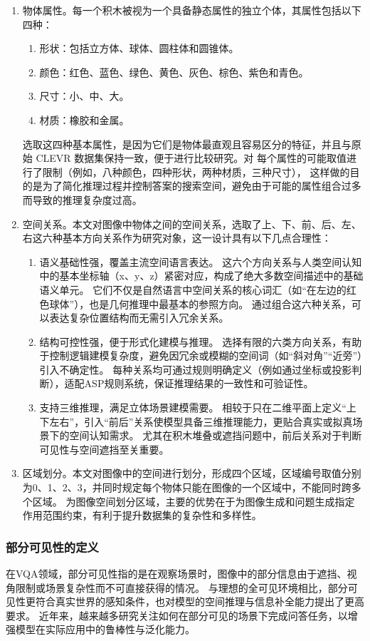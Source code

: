\begin{enumerate}[nosep]
\item 物体属性。每一个积木被视为一个具备静态属性的独立个体，其属性包括以下四种：
\begin{enumerate}[nosep]
\item 形状：包括立方体、球体、圆柱体和圆锥体。
\item 颜色：红色、蓝色、绿色、黄色、灰色、棕色、紫色和青色。
\item 尺寸：小、中、大。
\item 材质：橡胶和金属。
\end{enumerate}
选取这四种基本属性，是因为它们是物体最直观且容易区分的特征，并且与原始 CLEVR 数据集保持一致，便于进行比较研究。对
每个属性的可能取值进行了限制（例如，八种颜色，四种形状，两种材质，三种尺寸），
这样做的目的是为了简化推理过程并控制答案的搜索空间，避免由于可能的属性组合过多而导致的推理复杂度过高。
\item 空间关系。本文对图像中物体之间的空间关系，选取了上、下、前、后、左、右这六种基本方向关系作为研究对象，这一设计具有以下几点合理性：
\begin{enumerate}[nosep]
\item 语义基础性强，覆盖主流空间语言表达。
这六个方向关系与人类空间认知中的基本坐标轴（x、y、z）紧密对应，构成了绝大多数空间描述中的基础语义单元。
它们不仅是自然语言中空间关系的核心词汇（如“在左边的红色球体”），也是几何推理中最基本的参照方向。
通过组合这六种关系，可以表达复杂位置结构而无需引入冗余关系。
\item 结构可控性强，便于形式化建模与推理。
选择有限的六类方向关系，有助于控制逻辑建模复杂度，避免因冗余或模糊的空间词（如“斜对角”“近旁”）引入不确定性。
每种关系均可通过规则明确定义（例如通过坐标或投影判断），适配ASP规则系统，保证推理结果的一致性和可验证性。
\item 支持三维推理，满足立体场景建模需要。
相较于只在二维平面上定义“上下左右”，引入“前后”关系使模型具备三维推理能力，更贴合真实或拟真场景下的空间认知需求。
尤其在积木堆叠或遮挡问题中，前后关系对于判断可见性与空间遮挡至关重要。
\end{enumerate}
\item 区域划分。本文对图像中的空间进行划分，形成四个区域，区域编号取值分别为0、1、2、3，并同时规定每个物体只能在图像的一个区域中，不能同时跨多个区域。
为图像空间划分区域，主要的优势在于为图像生成和问题生成指定作用范围约束，有利于提升数据集的复杂性和多样性。
\end{enumerate}
\subsubsection{部分可见性的定义}
在VQA领域，部分可见性指的是在观察场景时，图像中的部分信息由于遮挡、视角限制或场景复杂性而不可直接获得的情况。
与理想的全可见环境相比，部分可见性更符合真实世界的感知条件，也对模型的空间推理与信息补全能力提出了更高要求。
近年来，越来越多研究关注如何在部分可见的场景下完成问答任务，以增强模型在实际应用中的鲁棒性与泛化能力。

